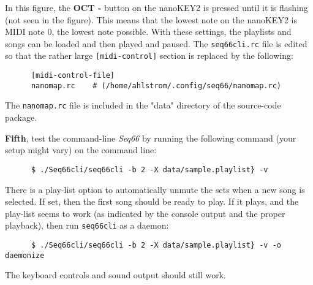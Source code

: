    In this figure, the \textbf{OCT -} button on the nanoKEY2 is pressed until
   it is flashing (not seen in the figure).
   This means that the lowest note on the nanoKEY2 is MIDI note 0, the lowest
   note possible.  With these settings, the playlists and songs can be loaded
   and then played and paused.
   The \texttt{seq66cli.rc} file is edited so that the rather large
   \texttt{[midi-control]} section is replaced by the following:

   \begin{verbatim}
      [midi-control-file]
      nanomap.rc    # (/home/ahlstrom/.config/seq66/nanomap.rc)
   \end{verbatim}

   The \texttt{nanomap.rc} file is included in the "data" directory of the
   source-code package.

   \textbf{Fifth}, test the command-line \textsl{Seq66} by running the
   following command (your setup might vary) on the command line:

   \begin{verbatim}
      $ ./Seq66cli/seq66cli -b 2 -X data/sample.playlist} -v
   \end{verbatim}

   There is a play-list option to automatically unmute the sets when a new song
   is selected.  If set, then the first song should be ready to play.
   If it plays, and the play-list seems to work (as indicated by the console
   output and the proper playback), then run \texttt{seq66cli} as a daemon:

   \begin{verbatim}
      $ ./Seq66cli/seq66cli -b 2 -X data/sample.playlist} -v -o daemonize
   \end{verbatim}

   The keyboard controls and sound output should still work.

